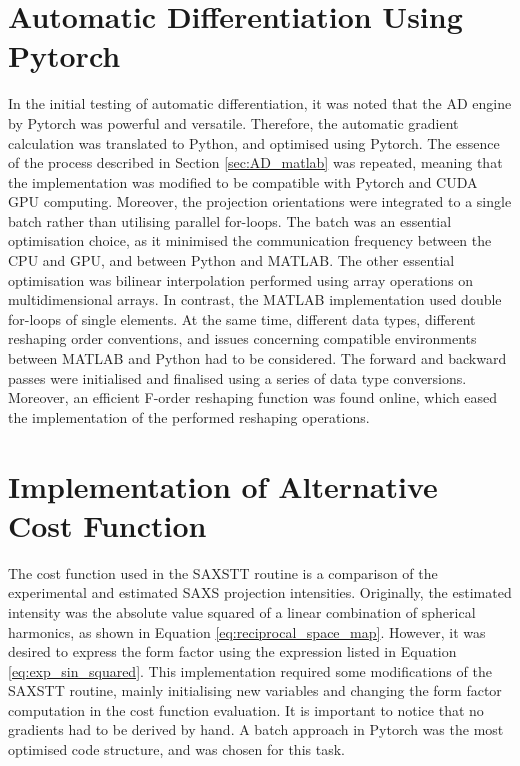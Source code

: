 \section{Automatic Differentiation Using Pytorch}\label{sec:AD_pytorch}

In the initial testing of automatic differentiation, it was noted that the AD engine by Pytorch was powerful and versatile.
Therefore, the automatic gradient calculation was translated to Python, and optimised using Pytorch.
The essence of the process described in Section \ref{sec:AD_matlab} was repeated,
meaning that the implementation was modified to be compatible with Pytorch and CUDA GPU computing.
Moreover, the projection orientations were integrated to a single batch rather than utilising parallel for-loops.
The batch was an essential optimisation choice, as it minimised the communication frequency between the CPU and GPU, and between Python and MATLAB.
The other essential optimisation was bilinear interpolation performed using array operations on multidimensional arrays.
In contrast, the MATLAB implementation used double for-loops of single elements.
At the same time, different data types, different reshaping order conventions, and issues concerning compatible environments between MATLAB and Python had to be considered.
The forward and backward passes were initialised and finalised using a series of data type conversions.
Moreover, an efficient F-order reshaping function was found online, which eased the implementation of the performed reshaping operations.

\section{Implementation of Alternative Cost Function}\label{sec:alternative_cost_function}

The cost function used in the SAXSTT routine is a comparison of the experimental and estimated SAXS projection intensities.
Originally, the estimated intensity was the absolute value squared of a linear combination of spherical harmonics, as shown in Equation \eqref{eq:reciprocal_space_map}.
However, it was desired to express the form factor using the expression listed in Equation \eqref{eq:exp_sin_squared}.
This implementation required some modifications of the SAXSTT routine, mainly initialising new variables and changing the form factor computation in the cost function evaluation.
It is important to notice that no gradients had to be derived by hand.
A batch approach in Pytorch was the most optimised code structure, and was chosen for this task.

